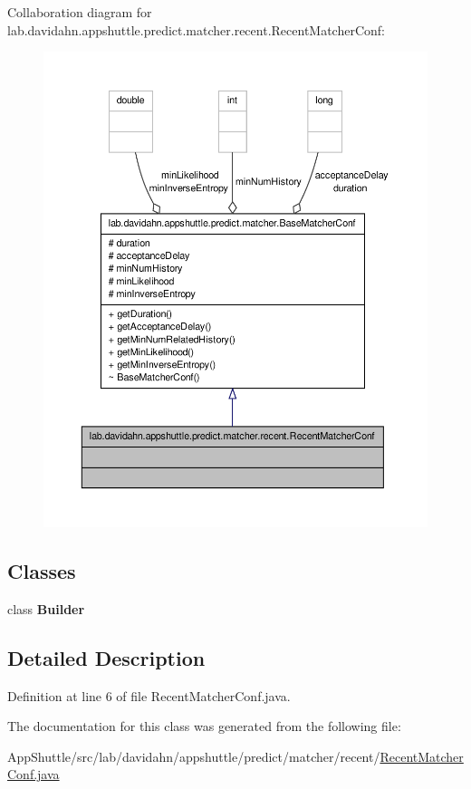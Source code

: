 \-Collaboration diagram for lab.\-davidahn.\-appshuttle.\-predict.\-matcher.\-recent.\-Recent\-Matcher\-Conf\-:
\nopagebreak
\begin{figure}[H]
\begin{center}
\leavevmode
\includegraphics[width=350pt]{classlab_1_1davidahn_1_1appshuttle_1_1predict_1_1matcher_1_1recent_1_1_recent_matcher_conf__coll__graph}
\end{center}
\end{figure}
\subsection*{\-Classes}
\begin{DoxyCompactItemize}
\item 
class {\bfseries \-Builder}
\end{DoxyCompactItemize}


\subsection{\-Detailed \-Description}


\-Definition at line 6 of file \-Recent\-Matcher\-Conf.\-java.



\-The documentation for this class was generated from the following file\-:\begin{DoxyCompactItemize}
\item 
\-App\-Shuttle/src/lab/davidahn/appshuttle/predict/matcher/recent/\hyperlink{_recent_matcher_conf_8java}{\-Recent\-Matcher\-Conf.\-java}\end{DoxyCompactItemize}
